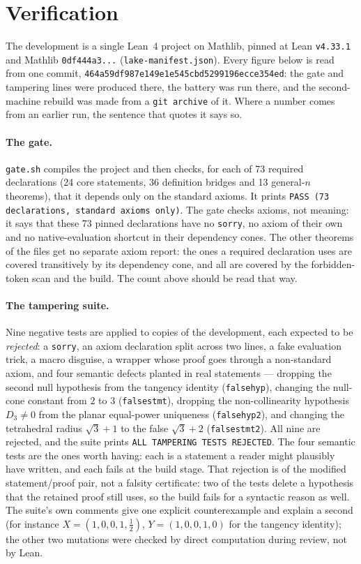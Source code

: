 \documentclass[11pt]{article}
\theoremstyle{definition}
\theoremstyle{remark}
\newcommand{\pkcommit}{464a59df987e149e1e545cbd5299196ecce354ed}
\begin{document}
\section{Verification}\label{sec:verification}

The development is a single Lean~4 project on Mathlib, pinned at Lean \texttt{v4.33.1} and Mathlib
\texttt{0df444a3...} (\texttt{lake-manifest.json}). Every figure below is
read from one commit, \texttt{\pkcommit}: the gate and tampering lines were produced there, the
battery was run there, and the second-machine rebuild was made from a \texttt{git archive} of it.
Where a number comes from an earlier run, the sentence that quotes it says so.

\paragraph{The gate.} \texttt{gate.sh} compiles the project and then checks, for each of 73 required
declarations (24 core statements, 36 definition bridges and 13 general-$n$ theorems), that it depends
only on the standard axioms. It prints \texttt{PASS (73 declarations, standard axioms only)}. The
gate checks axioms, not meaning: it says that these 73 pinned declarations have no \texttt{sorry},
no axiom of their own and no native-evaluation shortcut in their dependency cones. The other
theorems of the files get no separate axiom report: the ones a required declaration uses are covered
transitively by its dependency cone, and all are covered by the forbidden-token scan and the build.
The count above should be read that way.

\paragraph{The tampering suite.} Nine negative tests are applied to copies of the development, each
expected to be \emph{rejected}: a \texttt{sorry}, an axiom declaration split across two lines, a fake
evaluation trick, a macro disguise, a wrapper whose proof goes through a non-standard axiom, and four semantic defects
planted in real statements --- dropping the second null hypothesis from the tangency identity
(\texttt{falsehyp}), changing the null-cone constant from $2$ to $3$ (\texttt{falsestmt}), dropping
the non-collinearity hypothesis $D_3\neq0$ from the planar equal-power uniqueness
(\texttt{falsehyp2}), and changing the tetrahedral radius $\sqrt3+1$ to the false $\sqrt3+2$
(\texttt{falsestmt2}). All nine are rejected, and the suite prints
\texttt{ALL TAMPERING TESTS REJECTED}. The four semantic tests are the ones worth having: each is a
statement a reader might plausibly have written, and each fails at the build stage. That rejection is
of the modified statement/proof pair, not a falsity certificate: two of the tests delete a hypothesis
that the retained proof still uses, so the build fails for a syntactic reason as well. The suite's own
comments give one explicit counterexample and explain a second (for instance
$X=(1,0,0,1,\tfrac12)$, $Y=(1,0,0,1,0)$ for the tangency identity); the other two mutations were
checked by direct computation during review, not by Lean.
\end{document}
